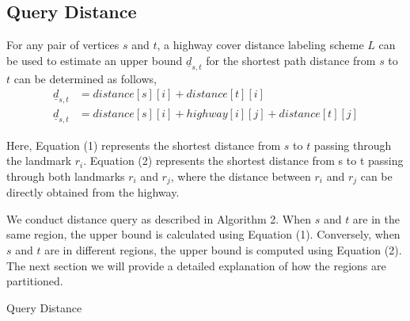 \documentclass[sigconf]{acmart}
\begin{document}
\subsection{Query Distance}
\label{sec:query_distance}
 For any pair of vertices $s$ and $t$, a highway cover distance labeling scheme $L$ can be used to estimate an upper bound $\underline{d}_{s,t}$ for the shortest path distance from $s$ to $t$ can be determined as follows,
%
\begin{align}
\underline{d}_{s,t} &= distance[s][i] + distance[t][i] \tag{1} \\
\underline{d}_{s,t} &= distance[s][i] + highway[i][j] + distance[t][j] \tag{2}
\end{align}
\par
Here, Equation (1) represents the shortest distance from $s$ to $t$ passing through the landmark $r_{i}$. Equation (2) represents the shortest distance from s to t passing through both landmarks $r_{i}$ and $r_{j}$, where the distance between $r_{i}$ and $r_{j}$ can be directly obtained from the highway. \par
We conduct distance query as described in Algorithm 2. When $s$ and $t$ are in the same region, the upper bound is calculated using Equation (1). Conversely, when $s$ and $t$ are in different regions, the upper bound is computed using Equation (2). The next section we will provide a detailed explanation of how the regions are partitioned. \par

%
%
\begin{algorithm}
    \caption{Query Distance}
    \label{alg:query-distance}
\end{algorithm}
\end{document}
